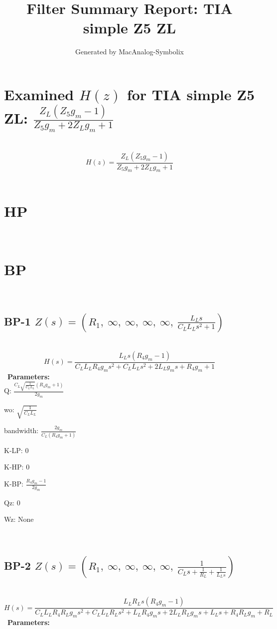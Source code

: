 \documentclass{article}
\begin{document}
        
                        \title{Filter Summary Report: TIA simple Z5 ZL}
                        \author{Generated by MacAnalog-Symbolix}
                        \maketitle

                        \tableofcontents
                        \newpage
                        \section{Examined $H(z)$ for TIA simple Z5 ZL: $\frac{Z_{L} \left(Z_{5} g_{m} - 1\right)}{Z_{5} g_{m} + 2 Z_{L} g_{m} + 1}$ }\ 
\textbf{\[H(z) = \frac{Z_{L} \left(Z_{5} g_{m} - 1\right)}{Z_{5} g_{m} + 2 Z_{L} g_{m} + 1}\] }\ 
\section{HP}\ 
\section{BP}\ 
\subsection{BP-1 $Z(s) = \left( R_{1}, \  \infty, \  \infty, \  \infty, \  \infty, \  \frac{L_{L} s}{C_{L} L_{L} s^{2} + 1}\right)$ } \ 
\textbf{\[H(s) = \frac{L_{L} s \left(R_{4} g_{m} - 1\right)}{C_{L} L_{L} R_{4} g_{m} s^{2} + C_{L} L_{L} s^{2} + 2 L_{L} g_{m} s + R_{4} g_{m} + 1}\] } \ 
\textbf{Parameters:}\\ 

Q: $\frac{C_{L} \sqrt{\frac{1}{C_{L} L_{L}}} \left(R_{4} g_{m} + 1\right)}{2 g_{m}}$\ 

wo: $\sqrt{\frac{1}{C_{L} L_{L}}}$\ 

bandwidth: $\frac{2 g_{m}}{C_{L} \left(R_{4} g_{m} + 1\right)}$\ 

K-LP: $0$\ 

K-HP: $0$\ 

K-BP: $\frac{R_{4} g_{m} - 1}{2 g_{m}}$\ 

Qz: $0$\ 

Wz: $\text{None}$\ 

\ 

\subsection{BP-2 $Z(s) = \left( R_{1}, \  \infty, \  \infty, \  \infty, \  \infty, \  \frac{1}{C_{L} s + \frac{1}{R_{L}} + \frac{1}{L_{L} s}}\right)$ } \ 
\textbf{\[H(s) = \frac{L_{L} R_{L} s \left(R_{4} g_{m} - 1\right)}{C_{L} L_{L} R_{4} R_{L} g_{m} s^{2} + C_{L} L_{L} R_{L} s^{2} + L_{L} R_{4} g_{m} s + 2 L_{L} R_{L} g_{m} s + L_{L} s + R_{4} R_{L} g_{m} + R_{L}}\] } \ 
\textbf{Parameters:}\\ 
\end{document}
